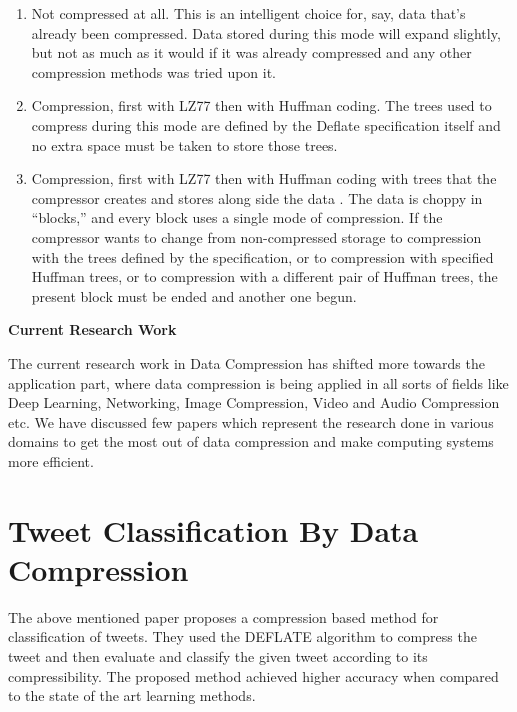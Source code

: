\documentclass{article}
\begin{document}
\begin{enumerate}
	\item Not compressed at all. This is an intelligent choice for, say, data that's already been compressed. Data stored during this mode will expand slightly, but not as much as it would if it was already compressed and any other compression methods was tried upon it.
	
	\item Compression, first with LZ77 then with Huffman coding. The trees used to compress during this mode are defined by the Deflate specification itself and no extra space must be taken to store those trees.
	
	\item Compression, first with LZ77 then with Huffman coding with trees that the compressor creates and stores along side the data .
	The data is choppy in ``blocks,'' and every block uses a single mode of compression. If the compressor wants to change  from non-compressed storage to compression with the trees defined by the specification, or to compression with specified Huffman trees, or to compression with a different pair of Huffman trees, the present block must be ended and another one begun.
	
\end{enumerate}

\vspace{0.6in}

\textbf{\Large{Current Research Work}}


The current research work in Data Compression has shifted more towards the application part, where data compression is being applied in all sorts of fields like Deep Learning, Networking, Image Compression, Video and Audio Compression etc. We have discussed few papers which represent the research done in various domains to get the most out of data compression and make computing systems more efficient.

\section{Tweet Classification By Data Compression \cite{10.1145/2064448.2064473}}

The above mentioned paper proposes a compression based method for classification of tweets. They used the DEFLATE algorithm to compress the tweet and then evaluate and classify the given tweet according to its compressibility. The proposed method achieved higher accuracy when compared to the state of the art learning methods. 
\end{document}
